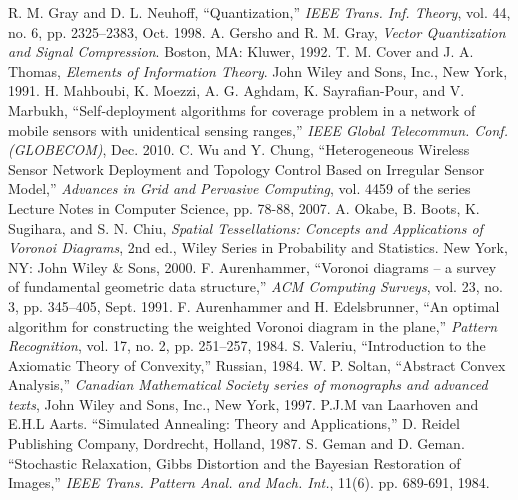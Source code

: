 \documentclass[journal,draftcls,onecolumn,12pt,twoside, narroweqnarray]{IEEEtran}
\begin{document}
\begin{thebibliography}{1}
R. M. Gray and D. L. Neuhoff, ``Quantization,'' \emph{IEEE Trans. Inf. Theory}, vol. 44, no. 6, pp. 2325--2383, Oct. 1998.
A. Gersho and R. M. Gray, \emph{Vector Quantization and Signal Compression}. Boston, MA: Kluwer, 1992.
T. M. Cover and J. A. Thomas, \emph{Elements of Information Theory}. John Wiley and Sons, Inc., New York, 1991.
H. Mahboubi, K. Moezzi, A. G. Aghdam, K. Sayrafian-Pour, and V. Marbukh, ``Self-deployment algorithms for coverage problem in a network of mobile sensors with unidentical sensing ranges,'' \emph{IEEE Global Telecommun. Conf. (GLOBECOM)}, Dec. 2010.
C. Wu and Y. Chung, ``Heterogeneous Wireless Sensor Network Deployment and Topology Control Based on Irregular Sensor Model,'' {\it Advances in Grid and Pervasive Computing}, vol. 4459 of the series Lecture Notes in Computer Science, pp. 78-88, 2007.
A. Okabe, B. Boots, K. Sugihara, and S. N. Chiu, {\it Spatial Tessellations: Concepts and Applications of Voronoi
Diagrams}, 2nd ed., Wiley Series in Probability and Statistics. New York, NY: John Wiley \& Sons, 2000.
F. Aurenhammer, ``Voronoi diagrams -- a survey of fundamental geometric data structure,'' \emph{ACM Computing Surveys}, vol. 23, no. 3, pp. 345--405, Sept. 1991.
F. Aurenhammer and H. Edelsbrunner, ``An optimal algorithm for constructing the weighted Voronoi diagram in the plane,'' \emph{Pattern Recognition}, vol. 17, no. 2, pp. 251--257, 1984.
S. Valeriu, ``Introduction to the Axiomatic Theory of Convexity,'' Russian, 1984.
W. P. Soltan, ``Abstract Convex Analysis,'' {\it Canadian Mathematical Society series of monographs and advanced texts}, John Wiley and Sons, Inc., New York,  1997.
P.J.M van Laarhoven and E.H.L Aarts. ``Simulated Annealing: Theory and Applications,'' D. Reidel Publishing Company, Dordrecht, Holland, 1987.
S. Geman and D. Geman. ``Stochastic Relaxation, Gibbs Distortion and the Bayesian Restoration of Images,'' {\it IEEE Trans. Pattern Anal. and Mach. Int.}, 11(6). pp. 689-691, 1984.



\end{thebibliography}
\end{document}
